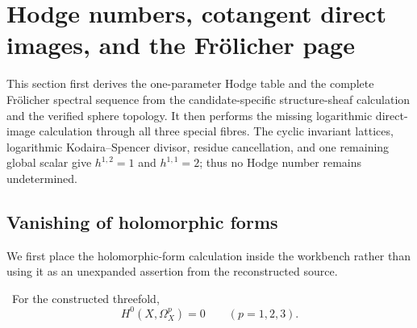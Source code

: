 \section{Hodge numbers, cotangent direct images, and the Fr\"olicher page}
\label{sec:hodge-frolicher}

This section first derives the one-parameter Hodge table and the complete
Fr\"olicher spectral sequence from the candidate-specific structure-sheaf
calculation and the verified sphere topology.  It then performs the missing
logarithmic direct-image calculation through all three special fibres.  The
cyclic invariant lattices, logarithmic Kodaira--Spencer divisor, residue
cancellation, and one remaining global scalar give
$h^{1,2}=1$ and $h^{1,1}=2$; thus no Hodge number remains undetermined.

\subsection{Vanishing of holomorphic forms}

We first place the holomorphic-form calculation inside the workbench rather
than using it as an unexpanded assertion from the reconstructed source.

\begin{proposition}
\label{prop:workbench-holomorphic-form-vanishing}
\Verified\ For the constructed threefold,
\[
 H^0(X,\Omega_X^p)=0\qquad (p=1,2,3).
\]
\end{proposition}

